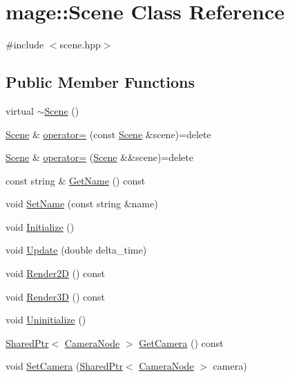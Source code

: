 \hypertarget{classmage_1_1_scene}{}\section{mage\+:\+:Scene Class Reference}
\label{classmage_1_1_scene}


{\ttfamily \#include $<$scene.\+hpp$>$}

\subsection*{Public Member Functions}
\begin{DoxyCompactItemize}
\item 
virtual \hyperlink{classmage_1_1_scene_adc40910fdca62586659c2961fe7e7f3c}{$\sim$\+Scene} ()
\item 
\hyperlink{classmage_1_1_scene}{Scene} \& \hyperlink{classmage_1_1_scene_a2c25c0fedc0230771d8c00a8288a69ce}{operator=} (const \hyperlink{classmage_1_1_scene}{Scene} \&scene)=delete
\item 
\hyperlink{classmage_1_1_scene}{Scene} \& \hyperlink{classmage_1_1_scene_a400926762670c9cd9b6d456291600f53}{operator=} (\hyperlink{classmage_1_1_scene}{Scene} \&\&scene)=delete
\item 
const string \& \hyperlink{classmage_1_1_scene_a251ff8f6ce0da5c55ee31e3450b5fb9a}{Get\+Name} () const
\item 
void \hyperlink{classmage_1_1_scene_a9b7c1c2f84cc3b3c5ff3de4f29d830e9}{Set\+Name} (const string \&name)
\item 
void \hyperlink{classmage_1_1_scene_a3cd12ef381ca743bf0b8f8aa2a76eb57}{Initialize} ()
\item 
void \hyperlink{classmage_1_1_scene_aa10e6eafc00834f63f146589326cbfe2}{Update} (double delta\+\_\+time)
\item 
void \hyperlink{classmage_1_1_scene_a53487349d68f0ffcc91b243d0cfb86a3}{Render2D} () const
\item 
void \hyperlink{classmage_1_1_scene_a51d2d441067d30cf3a444d6a80811f93}{Render3D} () const
\item 
void \hyperlink{classmage_1_1_scene_a714dc33c04dc2b8e2cec93564905b174}{Uninitialize} ()
\item 
\hyperlink{namespacemage_a1e01ae66713838a7a67d30e44c67703e}{Shared\+Ptr}$<$ \hyperlink{classmage_1_1_camera_node}{Camera\+Node} $>$ \hyperlink{classmage_1_1_scene_a4ce734c571a4ac2fc564cf1c641e7820}{Get\+Camera} () const
\item 
void \hyperlink{classmage_1_1_scene_a7568ec0884d04812af2f70990c8ec80d}{Set\+Camera} (\hyperlink{namespacemage_a1e01ae66713838a7a67d30e44c67703e}{Shared\+Ptr}$<$ \hyperlink{classmage_1_1_camera_node}{Camera\+Node} $>$ camera)

\end{DoxyCompactItemize}
